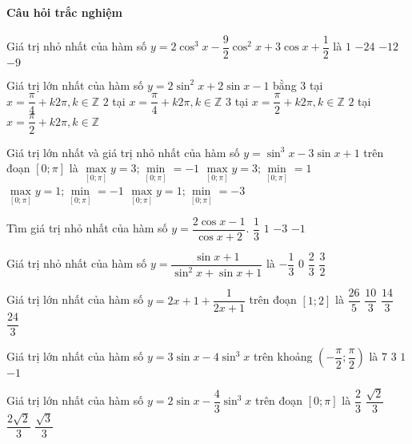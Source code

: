 \paragraph{Câu hỏi trắc nghiệm}
\begin{ex}%
	Giá trị nhỏ nhất của hàm số $y=2\cos^3x-\dfrac{9}{2}\cos^2x+3\cos x+\dfrac{1}{2}$ là 
	\choice
	{$1$}
	{$-24$}
	{$-12$}
	{\True $-9$}
\end{ex}
\begin{ex}%
	Giá trị lớn nhất của hàm số $y=2\sin^2x+2\sin x-1$ bằng 
	\choice
	{$3$ tại $x=\dfrac{\pi}{4}+k2\pi,k\in\mathbb{Z}$}
	{$2$ tại $x=\dfrac{\pi}{4}+k2\pi,k\in\mathbb{Z}$}
	{\True $3$ tại $x=\dfrac{\pi}{2}+k2\pi,k\in\mathbb{Z}$}
	{$2$ tại $x=\dfrac{\pi}{2}+k2\pi,k\in\mathbb{Z}$}
\end{ex}
\begin{ex}%
	Giá trị lớn nhất và giá trị nhỏ nhất của hàm số $y=\sin^3x-3\sin x+1$ trên đoạn $[0;\pi]$ là 
	\choice
	{$\max\limits_{[0;\pi]} y=3;\min\limits_{[0;\pi]}=-1$}
	{$\max\limits_{[0;\pi]} y=3;\min\limits_{[0;\pi]}=1$}
	{\True $\max\limits_{[0;\pi]} y=1;\min\limits_{[0;\pi]}=-1$}
	{$\max\limits_{[0;\pi]} y=1;\min\limits_{[0;\pi]}=-3$}
\end{ex}
\begin{ex}%
	Tìm giá trị nhỏ nhất của hàm số $y=\dfrac{2\cos x-1}{\cos x+2}$. 
	\choice
	{$\dfrac{1}{3}$}
	{$1$}
	{\True $-3$}
	{$-1$}
\end{ex}
\begin{ex}%
	Giá trị nhỏ nhất của hàm số $y=\dfrac{\sin x+1}{\sin^2x+\sin x+1}$ là 
	\choice
	{$-\dfrac{1}{3}$}
	{\True $0$}
	{$\dfrac{2}{3}$}
	{$\dfrac{3}{2}$}
\end{ex}
\begin{ex}%
	Giá trị lớn nhất của hàm số $y=2x+1+\dfrac{1}{2x+1}$ trên đoạn $[1;2]$ là 
	\choice
	{\True $\dfrac{26}{5}$}
	{$\dfrac{10}{3}$}
	{$\dfrac{14}{3}$}
	{$\dfrac{24}{3}$}
\end{ex}
\begin{ex}%
	Giá trị lớn nhất của hàm số $y=3\sin x-4\sin^3x$ trên khoảng $\left(-\dfrac{\pi}{2};\dfrac{\pi}{2}\right)$ là 
	\choice
	{$7$}
	{$3$}
	{\True $1$}
	{$-1$}
\end{ex}
\begin{ex}%
	Giá trị lớn nhất của hàm số $y=2\sin x-\dfrac{4}{3}\sin^3x$ trên đoạn $[0;\pi]$ là 
	\choice
	{$\dfrac{2}{3}$}
	{$\dfrac{\sqrt{2}}{3}$}
	{\True $\dfrac{2\sqrt{2}}{3}$}
	{$\dfrac{\sqrt{3}}{3}$}
\end{ex}
